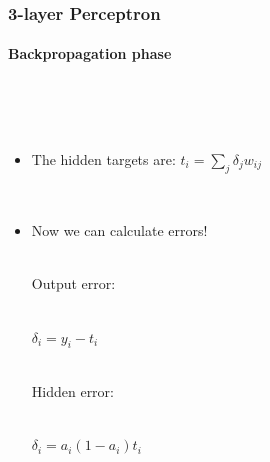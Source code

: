 \documentclass{beamer}
\begin{document}
\begin{frame}[fragile]
\frametitle{3-layer Perceptron}
\framesubtitle{Backpropagation phase}
 \begin{columns}[T]
    \begin{column}{.45\textwidth} 
             \  \\
 \   \\   
     
     
\begin{itemize}[<+->]
\item The hidden targets are: 
$  t_i = \sum_{j} \delta_j w_{ij} $


\ \\

 

 \item Now we  can calculate errors! 
 
 
\ \\

 
 Output error:
 
 
\ \\

 
$\delta_i = y_i - t_i $   
   
\ \\

 
   
   Hidden error:
   
   
\ \\

 
$\delta_i = a_i (1 - a_i)  t_i$
 
\end{itemize}
\end{column}
\begin{column}{.55\textwidth}
\begin{figure}[t]
 \begin{flushleft}


\end{flushleft}
\end{figure}
\end{column}
\end{columns}
\end{frame}
\end{document}
